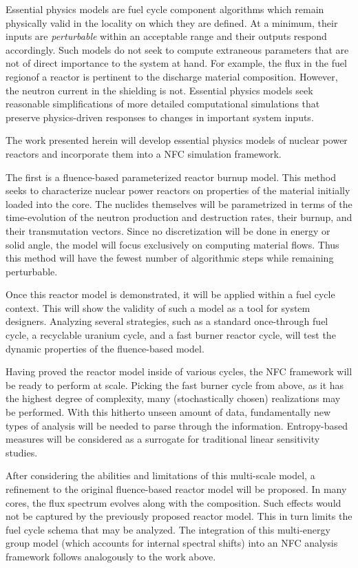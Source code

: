 Essential physics models are fuel cycle component algorithms which remain physically valid in the 
locality on which they are defined.  At a minimum, their inputs are \emph{perturbable} 
within an acceptable range and their outputs respond accordingly.  Such 
models do not seek to compute extraneous parameters that are not of direct importance
to the system at hand.  For example, the flux in the fuel regionof a reactor is 
pertinent to the discharge material composition.  However, the neutron current in the 
shielding is not. 
Essential physics models seek reasonable simplifications of more detailed computational 
simulations that preserve physics-driven responses to changes in important system 
inputs.

The work presented herein will develop essential physics models of nuclear power reactors
and incorporate them into a NFC simulation framework.

The first is a fluence-based parameterized reactor burnup model.  
This method seeks to characterize nuclear power
reactors on properties of the material initially loaded into the core.  The nuclides
themselves will be parametrized in terms of the time-evolution of the neutron production 
and destruction rates, their burnup, and their transmutation vectors.  Since no discretization
will be done in energy or solid angle, the model will focus exclusively on computing 
material flows.  Thus this method will have the fewest number of algorithmic steps while 
remaining perturbable. 

Once this reactor model is demonstrated, it will be applied within a fuel
cycle context.  This will show the validity of such a model as a tool for system designers.
Analyzing several strategies, such as a standard once-through fuel cycle, a recyclable uranium
cycle, and a fast burner reactor cycle, will test the dynamic properties of the fluence-based
model.  

Having proved the reactor model inside of various cycles, the NFC framework will be ready to 
perform at scale.  Picking the fast burner cycle from above, as it has the highest degree of complexity, 
many (stochastically chosen) realizations may be performed.  With this hitherto unseen amount of data, 
fundamentally new types of analysis will be needed to parse through the information.  Entropy-based measures
will be considered as a surrogate for traditional linear sensitivity studies.

After considering the abilities and limitations of this multi-scale model, a refinement to 
the original fluence-based reactor model will be proposed.  In many cores, the flux spectrum
evolves along with the composition.  Such effects would not be captured by the previously 
proposed reactor model.  This in turn limits the fuel cycle schema that may be analyzed.
The integration of this multi-energy group model (which 
accounts for internal spectral shifts) into an NFC analysis framework follows
analogously to the work above.


